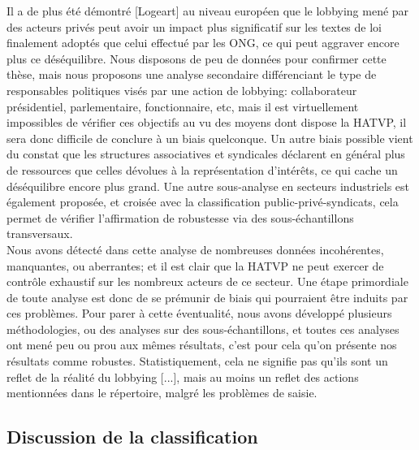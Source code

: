 \documentclass[a4paper,12pt]{article}
\begin{document}
 
Il a de plus été démontré  [Logeart] au niveau européen que le lobbying mené par des acteurs privés peut avoir un impact plus significatif sur les textes de loi finalement adoptés que celui effectué par les ONG, ce qui peut aggraver encore plus ce déséquilibre. Nous disposons de peu de données pour confirmer cette thèse, mais nous proposons une analyse secondaire différenciant le type de responsables politiques visés par une action de lobbying: collaborateur présidentiel, parlementaire, fonctionnaire, etc, mais il est virtuellement impossibles de vérifier ces objectifs au vu des moyens dont dispose la HATVP, il sera donc difficile de 
conclure à un biais quelconque. Un autre biais possible vient du constat que les structures associatives et syndicales déclarent en général plus de ressources que celles dévolues à la représentation d'intér\^ets, ce qui cache un déséquilibre encore plus grand. Une autre sous-analyse en secteurs industriels est également proposée, et croisée avec la classification public-privé-syndicats, cela permet de vérifier l'affirmation de robustesse via des sous-échantillons transversaux. \\

Nous avons détecté dans cette analyse de nombreuses données incohérentes, manquantes, ou aberrantes; et il est clair que la HATVP ne peut exercer de contr\^ole exhaustif sur les nombreux acteurs de ce secteur. Une étape primordiale de toute  analyse est donc de se prémunir de biais qui pourraient \^etre induits par ces problèmes. Pour parer à cette éventualité, nous avons développé plusieurs méthodologies, ou des analyses sur des sous-échantillons, et toutes ces analyses ont mené peu ou prou aux m\^emes résultats, c'est pour cela qu'on présente nos résultats comme robustes. Statistiquement, cela ne signifie pas qu'ils sont un reflet de la réalité du lobbying [...], mais au moins un reflet des actions mentionnées dans le répertoire, malgré les problèmes de saisie.


\subsection{Discussion de la classification}
\end{document}
